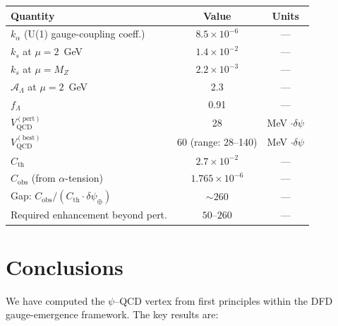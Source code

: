 \documentclass[aps,prd,twocolumn,superscriptaddress,floatfix,nofootinbib]{revtex4-2}
\newcommand{\ka}{k_\alpha}
\newcommand{\ks}{k_s}
\newcommand{\dpsi}{\delta\psi}
\begin{document}
\begin{center}
\renewcommand{\arraystretch}{1.3}
\begin{tabular}{lcc}
\toprule
\textbf{Quantity} & \textbf{Value} & \textbf{Units} \\
\midrule
$\ka$ (U(1) gauge-coupling coeff.) & $8.5 \times 10^{-6}$ & --- \\
$\ks$ at $\mu = 2$~GeV & $1.4 \times 10^{-2}$ & --- \\
$\ks$ at $\mu = M_Z$ & $2.2 \times 10^{-3}$ & --- \\
$\mathcal{A}_\Lambda$ at $\mu = 2$~GeV & 2.3 & --- \\
$f_\Lambda$ & 0.91 & --- \\
$V_{\mathrm{QCD}}^{(\mathrm{pert})}$ & 28 & MeV $\cdot \dpsi$ \\
$V_{\mathrm{QCD}}^{(\mathrm{best})}$ & 60 (range: 28--140) & MeV $\cdot \dpsi$ \\
$C_{\mathrm{th}}$ & $2.7 \times 10^{-2}$ & --- \\
$C_{\mathrm{obs}}$ (from $\alpha$-tension) & $1.765 \times 10^{-6}$ & --- \\
Gap: $C_{\mathrm{obs}} / (C_{\mathrm{th}} \cdot \dpsi_\oplus)$ & $\sim 260$ & --- \\
Required enhancement beyond pert. & $50$--$260$ & --- \\
\bottomrule
\end{tabular}
\end{center}


\section{Conclusions}\label{sec:conclusions}

We have computed the $\psi$--QCD vertex from first principles within the DFD
gauge-emergence framework. The key results are:
\end{document}
